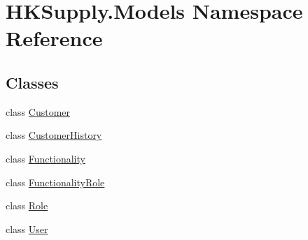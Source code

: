 \hypertarget{namespace_h_k_supply_1_1_models}{}\section{H\+K\+Supply.\+Models Namespace Reference}
\label{namespace_h_k_supply_1_1_models}
\subsection*{Classes}
\begin{DoxyCompactItemize}
\item 
class \hyperlink{class_h_k_supply_1_1_models_1_1_customer}{Customer}
\item 
class \hyperlink{class_h_k_supply_1_1_models_1_1_customer_history}{Customer\+History}
\item 
class \hyperlink{class_h_k_supply_1_1_models_1_1_functionality}{Functionality}
\item 
class \hyperlink{class_h_k_supply_1_1_models_1_1_functionality_role}{Functionality\+Role}
\item 
class \hyperlink{class_h_k_supply_1_1_models_1_1_role}{Role}
\item 
class \hyperlink{class_h_k_supply_1_1_models_1_1_user}{User}
\end{DoxyCompactItemize}
